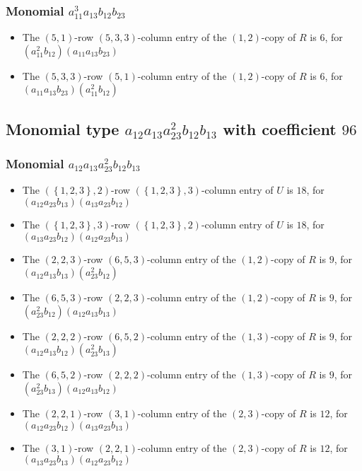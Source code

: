 \documentclass{article}
\begin{document}
\subsubsection{Monomial $ a_{11}^{3} a_{13} b_{12} b_{23} $}

\begin{itemize}
\item The $(5, 1)$-row $(5, 3, 3)$-column entry of the $ \left(1, 2\right) $-copy of $R$ is $ 6 $, for $( a_{11}^{2} b_{12} )( a_{11} a_{13} b_{23} )$ 
\item The $(5, 3, 3)$-row $(5, 1)$-column entry of the $ \left(1, 2\right) $-copy of $R$ is $ 6 $, for $( a_{11} a_{13} b_{23} )( a_{11}^{2} b_{12} )$ 
\end{itemize}
\subsection{Monomial type $ a_{12} a_{13} a_{23}^{2} b_{12} b_{13} $ with coefficient $ 96 $}

\subsubsection{Monomial $ a_{12} a_{13} a_{23}^{2} b_{12} b_{13} $}

\begin{itemize}
\item The $ \left(\left\{1, 2, 3\right\}, 2\right) $-row $ \left(\left\{1, 2, 3\right\}, 3\right) $-column entry of $U$ is $ 18 $, for $( a_{12} a_{23} b_{13} )( a_{13} a_{23} b_{12} )$ 
\item The $ \left(\left\{1, 2, 3\right\}, 3\right) $-row $ \left(\left\{1, 2, 3\right\}, 2\right) $-column entry of $U$ is $ 18 $, for $( a_{13} a_{23} b_{12} )( a_{12} a_{23} b_{13} )$ 
\item The $(2, 2, 3)$-row $(6, 5, 3)$-column entry of the $ \left(1, 2\right) $-copy of $R$ is $ 9 $, for $( a_{12} a_{13} b_{13} )( a_{23}^{2} b_{12} )$ 
\item The $(6, 5, 3)$-row $(2, 2, 3)$-column entry of the $ \left(1, 2\right) $-copy of $R$ is $ 9 $, for $( a_{23}^{2} b_{12} )( a_{12} a_{13} b_{13} )$ 
\item The $(2, 2, 2)$-row $(6, 5, 2)$-column entry of the $ \left(1, 3\right) $-copy of $R$ is $ 9 $, for $( a_{12} a_{13} b_{12} )( a_{23}^{2} b_{13} )$ 
\item The $(6, 5, 2)$-row $(2, 2, 2)$-column entry of the $ \left(1, 3\right) $-copy of $R$ is $ 9 $, for $( a_{23}^{2} b_{13} )( a_{12} a_{13} b_{12} )$ 
\item The $(2, 2, 1)$-row $(3, 1)$-column entry of the $ \left(2, 3\right) $-copy of $R$ is $ 12 $, for $( a_{12} a_{23} b_{12} )( a_{13} a_{23} b_{13} )$ 
\item The $(3, 1)$-row $(2, 2, 1)$-column entry of the $ \left(2, 3\right) $-copy of $R$ is $ 12 $, for $( a_{13} a_{23} b_{13} )( a_{12} a_{23} b_{12} )$ 
\end{itemize}
\end{document}
